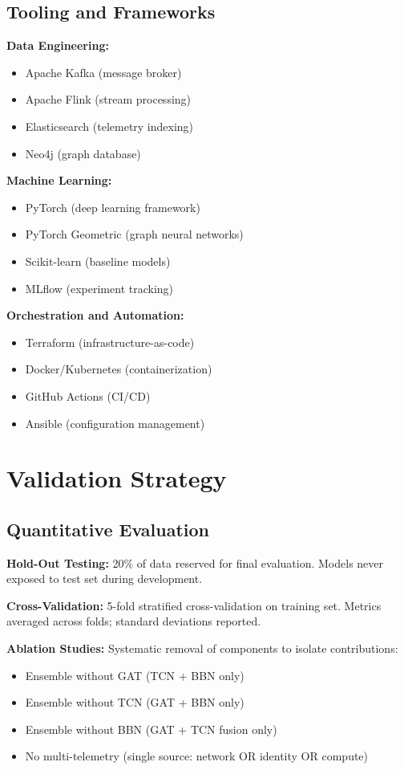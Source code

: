 \subsection{Tooling and Frameworks}
\textbf{Data Engineering:}
\begin{itemize}
    \item Apache Kafka (message broker)
    \item Apache Flink (stream processing)
    \item Elasticsearch (telemetry indexing)
    \item Neo4j (graph database)
\end{itemize}

\textbf{Machine Learning:}
\begin{itemize}
    \item PyTorch (deep learning framework)
    \item PyTorch Geometric (graph neural networks)
    \item Scikit-learn (baseline models)
    \item MLflow (experiment tracking)
\end{itemize}

\textbf{Orchestration and Automation:}
\begin{itemize}
    \item Terraform (infrastructure-as-code)
    \item Docker/Kubernetes (containerization)
    \item GitHub Actions (CI/CD)
    \item Ansible (configuration management)
\end{itemize}

\section{Validation Strategy}\label{sec:method-validation}
\subsection{Quantitative Evaluation}
\textbf{Hold-Out Testing:} 20\% of data reserved for final evaluation. Models never exposed to test set during development.

\textbf{Cross-Validation:} 5-fold stratified cross-validation on training set. Metrics averaged across folds; standard deviations reported.

\textbf{Ablation Studies:} Systematic removal of components to isolate contributions:
\begin{itemize}
    \item Ensemble without GAT (TCN + BBN only)
    \item Ensemble without TCN (GAT + BBN only)
    \item Ensemble without BBN (GAT + TCN fusion only)
    \item No multi-telemetry (single source: network OR identity OR compute)
\end{itemize}

